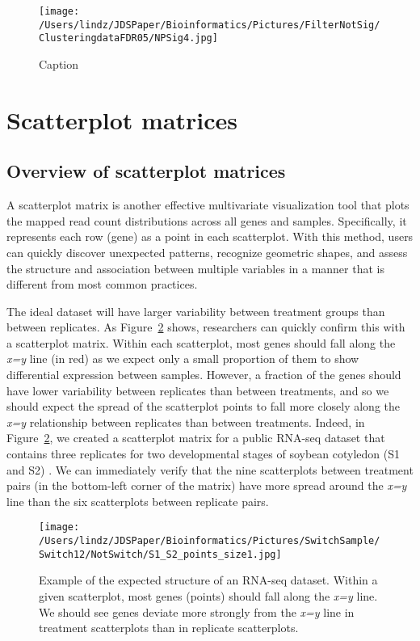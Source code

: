 \documentclass{bioinfo}
\begin{document}
\begin{figure}[!tpb]
\centerline{\texttt{[image: /Users/lindz/JDSPaper/Bioinformatics/Pictures/FilterNotSig/ClusteringdataFDR05/NPSig4.jpg]}}
\caption{Caption
\label{clusterPCP4Sig}}
\end{figure}

\section{Scatterplot matrices}

\subsection{Overview of scatterplot matrices}

A scatterplot matrix is another effective multivariate visualization tool that plots the mapped read count distributions across all genes and samples. Specifically, it represents each row (gene) as a point in each scatterplot. With this method, users can quickly discover unexpected patterns, recognize geometric shapes, and assess the structure and association between multiple variables in a manner that is different from most common practices. 

The ideal dataset will have larger variability between treatment groups than between replicates. As Figure~\ref{cotyIdeal} shows, researchers can quickly confirm this with a scatterplot matrix. Within each scatterplot, most genes should fall along the \textit{x=y} line (in red) as we expect only a small proportion of them to show differential expression between samples. However, a fraction of the genes should have lower variability between replicates than between treatments, and so we should expect the spread of the scatterplot points to fall more closely along the \textit{x=y} relationship between replicates than between treatments. Indeed, in Figure~\ref{cotyIdeal}, we created a scatterplot matrix for a public RNA-seq dataset that contains three replicates for two developmental stages of soybean cotyledon (S1 and S2) \citep{Brown}. We can immediately verify that the nine scatterplots between treatment pairs (in the bottom-left corner of the matrix) have more spread around the \textit{x=y} line than the six scatterplots between replicate pairs.

\begin{figure}[!tpb]
\centerline{\texttt{[image: /Users/lindz/JDSPaper/Bioinformatics/Pictures/SwitchSample/Switch12/NotSwitch/S1\_S2\_points\_size1.jpg]}}
\caption{Example of the expected structure of an RNA-seq dataset. Within a given scatterplot, most genes (points) should fall along the \textit{x=y} line. We should see genes deviate more strongly from the \textit{x=y} line in treatment scatterplots than in replicate scatterplots. 
\label{cotyIdeal}}
\end{figure}
\end{document}
